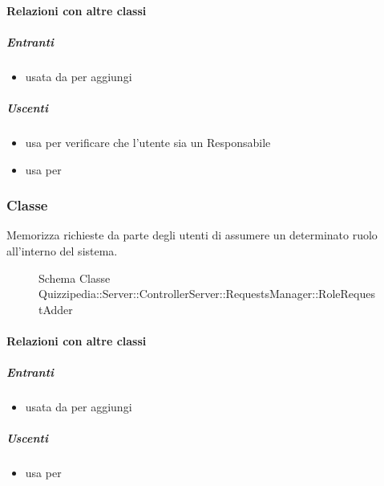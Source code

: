 \paragraph{Relazioni con altre classi}
\subparagraph{Entranti}
\begin{itemize}
\item usata da  per aggiungi
\end{itemize}
\subparagraph{Uscenti}
\begin{itemize}
\item usa  per verificare che l'utente sia un Responsabile
\item usa  per 
\end{itemize}
\subsubsection{Classe }
Memorizza richieste da parte degli utenti di assumere un determinato ruolo all'interno del sistema.
\begin{figure}[H]
\centering
\noindent{}
\caption[Schema Classe RoleRequestAdder]{Schema Classe Quizzipedia::Server::ControllerServer::RequestsManager::RoleRequestAdder}
\end{figure}
\paragraph{Relazioni con altre classi}
\subparagraph{Entranti}
\begin{itemize}
\item usata da  per aggiungi
\end{itemize}
\subparagraph{Uscenti}
\begin{itemize}
\item usa  per 
\end{itemize}
